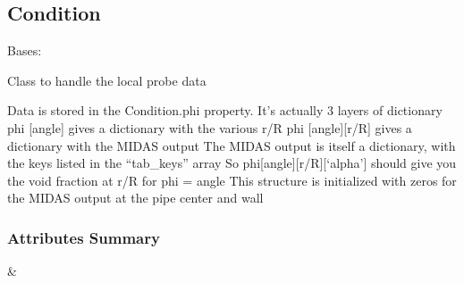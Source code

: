\documentclass[letterpaper,10pt,english]{sphinxmanual}
\begin{document}
\sphinxstepscope


\subsection{Condition}
\label{\detokenize{api/MARIGOLD.Condition:condition}}\label{\detokenize{api/MARIGOLD.Condition::doc}}

\begin{fulllineitems}
\label{\detokenize{api/MARIGOLD.Condition:MARIGOLD.Condition}}
\pysigstartsignatures
{}
\pysigstopsignatures
\sphinxAtStartPar
Bases: 

\sphinxAtStartPar
Class to handle the local probe data

\sphinxAtStartPar
Data is stored in the Condition.phi property. It’s actually 3 layers of dictionary
phi {[}angle{]} gives a dictionary with the various r/R
phi {[}angle{]}{[}r/R{]} gives a dictionary with the MIDAS output
The MIDAS output is itself a dictionary, with the keys listed in the “tab\_keys” array
So phi{[}angle{]}{[}r/R{]}{[}‘alpha’{]} should give you the void fraction at r/R for phi = angle
This structure is initialized with zeros for the MIDAS output at the pipe center and wall
\subsubsection*{Attributes Summary}


\begin{savenotes}\sphinxattablestart
\sphinxthistablewithglobalstyle
\sphinxthistablewithnovlinesstyle
\centering
\begin{tabulary}{\linewidth}[t]{}
\sphinxtoprule
\sphinxtableatstartofbodyhook
\sphinxAtStartPar
{}
&
\sphinxAtStartPar


\end{tabulary}
\end{savenotes}
\end{fulllineitems}
\end{document}
